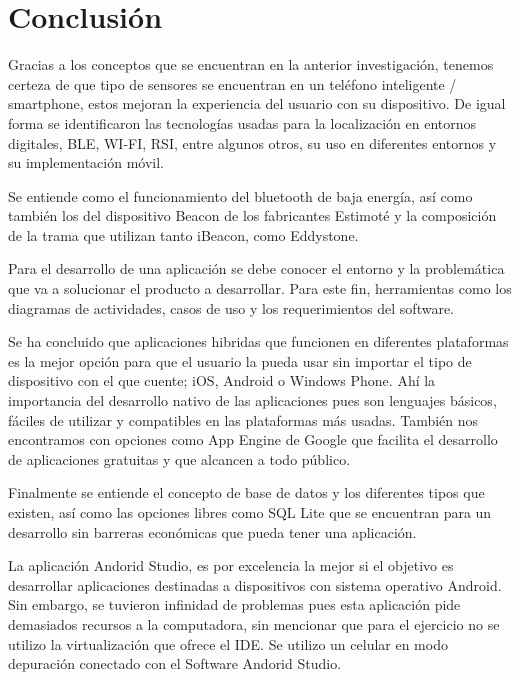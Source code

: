 \documentclass[conference,compsoc,onecolumn]{IEEEtran}
\begin{document}
\section{Conclusión}

Gracias a los conceptos que se encuentran en la anterior investigación, tenemos certeza de que tipo de sensores se encuentran en un teléfono inteligente / smartphone, estos mejoran la experiencia del usuario con su dispositivo. De igual forma se identificaron las tecnologías usadas para la localización en entornos digitales, BLE, WI-FI, RSI, entre algunos otros, su uso en diferentes entornos y su implementación móvil.\newline

Se entiende como el funcionamiento del bluetooth de baja energía, así como también los del dispositivo Beacon de los fabricantes Estimoté y la composición de la trama que utilizan tanto iBeacon, como Eddystone.\newline

Para el desarrollo de una aplicación se debe conocer el entorno y la problemática que va a solucionar el producto a desarrollar. Para este fin, herramientas como los diagramas de actividades, casos de uso y los requerimientos del software.\newline

Se ha concluido que aplicaciones hibridas que funcionen en diferentes plataformas es la mejor opción para que el usuario la pueda usar sin importar el tipo de dispositivo con el que cuente; iOS, Android o Windows Phone. Ahí la importancia del desarrollo nativo de las aplicaciones pues son lenguajes básicos, fáciles de utilizar y compatibles en las plataformas más usadas. También nos encontramos con opciones como App Engine de Google que facilita el desarrollo de aplicaciones gratuitas y que alcancen a todo público.\newline

Finalmente se entiende el concepto de base de datos y los diferentes tipos que existen, así como las opciones libres como SQL Lite que se encuentran para un desarrollo sin barreras económicas que pueda tener una aplicación.\newline

La aplicación Andorid Studio, es por excelencia la mejor si el objetivo es desarrollar aplicaciones destinadas a dispositivos con sistema operativo Android. Sin embargo, se tuvieron infinidad de problemas pues esta aplicación pide demasiados recursos a la computadora, sin mencionar que para el ejercicio no se utilizo la virtualización que ofrece el IDE. Se utilizo un celular en modo depuración conectado con el Software Andorid Studio.
\end{document}
